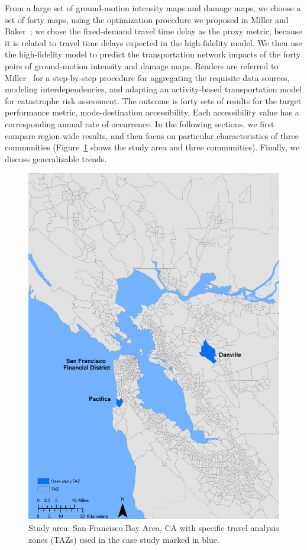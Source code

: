 From a large set of ground-motion intensity maps and damage maps, we choose a set of forty maps, using the optimization procedure we proposed in Miller and Baker~\cite{miller_ground-motion_2014}; we chose the fixed-demand travel time delay as the proxy metric, because it is related to travel time delays expected in the high-fidelity model. We then use the high-fidelity model to predict the transportation network impacts of the forty pairs of ground-motion intensity and damage maps. Readers are referred to Miller~\cite{miller_seismic_2014} for a step-by-step procedure for aggregating the requisite data sources, modeling interdependencies, and adapting an activity-based transportation model for catastrophe risk assessment. The outcome is forty sets of results for the target performance metric, mode-destination accessibility. Each accessibility value has a corresponding annual rate of occurrence.
In the following sections, we first compare region-wide results, and then focus on particular characteristics of three communities (Figure~\ref{fig:equity_study_area} shows the study area and three communities). Finally, we discuss generalizable trends.
\begin{figure}
\centering
\includegraphics[width=6in]{FIGS/equity_case.pdf} 
\caption{Study area: San Francisco Bay Area, CA with specific travel analysis zones (TAZs) used in the case study marked in blue.}
\label{fig:equity_study_area}
\end{figure}


